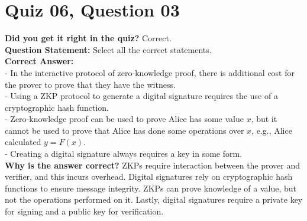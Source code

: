 \documentclass{article}
\begin{document}
\section*{Quiz 06, Question 03}
\textbf{Did you get it right in the quiz?} Correct. \\
\textbf{Question Statement:} Select all the correct statements. \\
\textbf{Correct Answer:} \\
- In the interactive protocol of zero-knowledge proof, there is additional cost for the prover to prove that they have the witness. \\
- Using a ZKP protocol to generate a digital signature requires the use of a cryptographic hash function. \\
- Zero-knowledge proof can be used to prove Alice has some value \( x \), but it cannot be used to prove that Alice has done some operations over \( x \), e.g., Alice calculated \( y=F(x) \). \\
- Creating a digital signature always requires a key in some form. \\
\textbf{Why is the answer correct?} ZKPs require interaction between the prover and verifier, and this incurs overhead. Digital signatures rely on cryptographic hash functions to ensure message integrity. ZKPs can prove knowledge of a value, but not the operations performed on it. Lastly, digital signatures require a private key for signing and a public key for verification.
\end{document}
